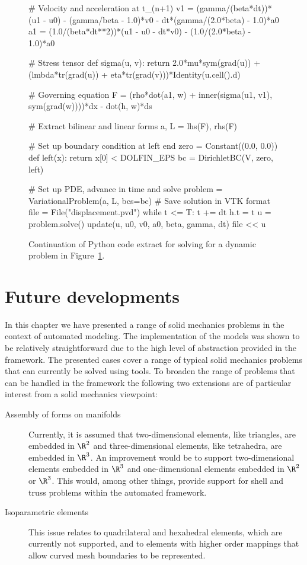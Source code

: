 \begin{figure}
\begin{python}
# Velocity and acceleration at t_(n+1)
v1 = (gamma/(beta*dt))*(u1 - u0) - (gamma/beta - 1.0)*v0 - dt*(gamma/(2.0*beta) - 1.0)*a0
a1 = (1.0/(beta*dt**2))*(u1 - u0 - dt*v0) - (1.0/(2.0*beta) - 1.0)*a0

# Stress tensor
def sigma(u, v):
    return 2.0*mu*sym(grad(u)) + (lmbda*tr(grad(u)) + eta*tr(grad(v)))*Identity(u.cell().d)

# Governing equation
F = (rho*dot(a1, w) + inner(sigma(u1, v1), sym(grad(w))))*dx - dot(h, w)*ds

# Extract bilinear and linear forms
a, L = lhs(F), rhs(F)

# Set up boundary condition at left end
zero = Constant((0.0, 0.0))
def left(x):
    return x[0] < DOLFIN_EPS
bc = DirichletBC(V, zero, left)

# Set up PDE, advance in time and solve
problem = VariationalProblem(a, L, bcs=bc)
# Save solution in VTK format
file = File("displacement.pvd")
while t <= T:
    t += dt
    h.t = t
    u = problem.solve()
    update(u, u0, v0, a0, beta, gamma, dt)
    file << u
\end{python}
\caption{Continuation of Python code extract for solving for a dynamic
problem in Figure~\ref{fig:oelgaard-1:time_ufl_code2}.}
\label{fig:oelgaard-1:time_ufl_code2}
\end{figure}
\section{Future developments}

In this chapter we have presented a range of solid mechanics problems in
the context of automated modeling.  The implementation of the models
was shown to be relatively straightforward due to the high level of
abstraction provided in the \fenics framework.  The presented cases
cover a range of typical solid mechanics problems that can currently be
solved using \fenics tools.  To broaden the range of problems that can
be handled in the \fenics framework the following two extensions are of
particular interest from a solid mechanics viewpoint:
\begin{description}
\item [Assembly of forms on manifolds] Currently, it is assumed that
two-dimensional elements, like triangles, are embedded in $\R^2$ and
three-dimensional elements, like tetrahedra, are embedded in $\R^3$.
An improvement would be to support two-dimensional elements embedded
in $\R^3$ and one-dimensional elements embedded in $\R^2$ or $\R^3$.
This would, among other things, provide support for shell and truss
problems within the automated framework.

\item [Isoparametric elements] This issue relates to quadrilateral
and hexahedral elements, which are currently not supported, and to
elements with higher order mappings that allow curved mesh boundaries
to be represented.
\end{description}
